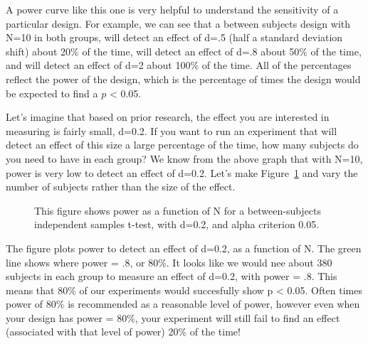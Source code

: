 \documentclass[
  letterpaper,
  DIV=11,
  numbers=noendperiod]{scrreprt}
\begin{document}
A power curve like this one is very helpful to understand the
sensitivity of a particular design. For example, we can see that a
between subjects design with N=10 in both groups, will detect an effect
of d=.5 (half a standard deviation shift) about 20\% of the time, will
detect an effect of d=.8 about 50\% of the time, and will detect an
effect of d=2 about 100\% of the time. All of the percentages reflect
the power of the design, which is the percentage of times the design
would be expected to find a \(p\) \textless{} 0.05.

Let's imagine that based on prior research, the effect you are
interested in measuring is fairly small, d=0.2. If you want to run an
experiment that will detect an effect of this size a large percentage of
the time, how many subjects do you need to have in each group? We know
from the above graph that with N=10, power is very low to detect an
effect of d=0.2. Let's make Figure~\ref{fig-13powercurveN} and vary the
number of subjects rather than the size of the effect.

\begin{figure}


\caption{\label{fig-13powercurveN}This figure shows power as a function
of N for a between-subjects independent samples t-test, with d=0.2, and
alpha criterion 0.05.}

\end{figure}%

The figure plots power to detect an effect of d=0.2, as a function of N.
The green line shows where power = .8, or 80\%. It looks like we would
nee about 380 subjects in each group to measure an effect of d=0.2, with
power = .8. This means that 80\% of our experiments would succesfully
show p \textless{} 0.05. Often times power of 80\% is recommended as a
reasonable level of power, however even when your design has power =
80\%, your experiment will still fail to find an effect (associated with
that level of power) 20\% of the time!
\end{document}
